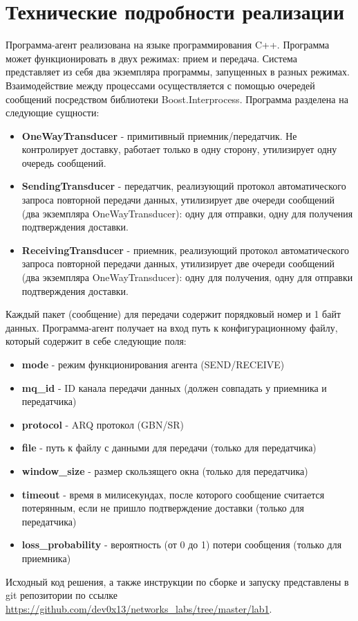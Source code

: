 \documentclass{report}
\begin{document}
\section{Технические подробности реализации}
Программа-агент реализована на языке программирования C++. Программа может функционировать в двух режимах: прием и передача. Система представляет из себя два экземпляра программы, запущенных в разных режимах. Взаимодействие между процессами осуществляется с помощью очередей сообщений посредством библиотеки Boost.Interprocess.
\newline
\newline
Программа разделена на следующие сущности:
\begin{itemize}
    \item {\bf OneWayTransducer} - примитивный приемник/передатчик. Не контролирует доставку, работает только в одну сторону, утилизирует одну очередь сообщений.
    \item {\bf SendingTransducer} - передатчик, реализующий протокол автоматического запроса повторной передачи данных, утилизирует две очереди сообщений (два экземпляра OneWayTransducer): одну для отправки, одну для получения подтверждения доставки.
    \item {\bf ReceivingTransducer} - приемник, реализующий протокол автоматического запроса повторной передачи данных, утилизирует две очереди сообщений (два экземпляра OneWayTransducer): одну для получения, одну для отправки подтверждения доставки.
\end{itemize}
Каждый пакет (сообщение) для передачи содержит порядковый номер и 1 байт данных.
\newline
Программа-агент получает на вход путь к конфигурационному файлу, который содержит в себе следующие поля:
\begin{itemize}
    \item {\bf mode} - режим функционирования агента (SEND/RECEIVE)
    \item {\bf mq\_id} - ID канала передачи данных (должен совпадать у приемника и передатчика)
    \item {\bf protocol} - ARQ протокол (GBN/SR)
    \item {\bf file} - путь к файлу с данными для передачи (только для передатчика)
    \item {\bf window\_size} - размер скользящего окна (только для передатчика)
    \item {\bf timeout} - время в милисекундах, после которого сообщение считается потерянным, если не пришло подтверждение доставки (только для передатчика)
    \item {\bf loss\_probability} - вероятность (от 0 до 1) потери сообщения (только для приемника)
\end{itemize}
\newline
Исходный код решения, а также инструкции по сборке и запуску представлены в git репозитории по ссылке \url{https://github.com/dev0x13/networks_labs/tree/master/lab1}.
\newpage
\end{document}
